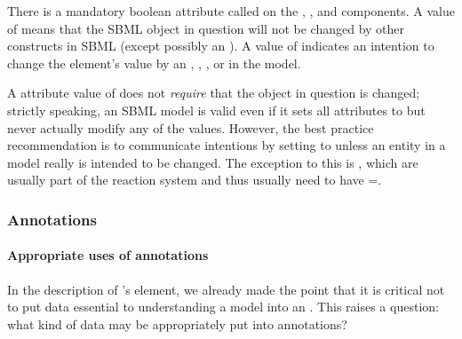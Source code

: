 There is a mandatory boolean attribute called  on
the \Compartment, \Species, \SpeciesReference and
\Parameter components.  A value of  means that the SBML
object in question will not be changed by other constructs in SBML
(except possibly an \InitialAssignment).  A value of 
indicates an intention to change the element's value by an
\AssignmentRule, \RateRule, \AlgebraicRule, \Reaction or \Event in
the model.

A  attribute value of  does not
\emph{require} that the object in question is changed; strictly
speaking, an SBML model is valid even if it sets all
 attributes to  but never actually
modify any of the values.  However, the best practice
recommendation is to communicate intentions by setting
 to  unless an entity in a model really
is intended to be changed.  The exception to this is \Species,
which are usually part of the reaction system and thus usually
need to have =.


\subsubsection{Annotations}
\label{sec:bp:annotations}

\paragraph{Appropriate uses of annotations}

In the description of \SBase's  element, we
already made the point that it is critical not to put data
essential to understanding a model into an .
This raises a question: what kind of data may be appropriately
put into annotations?

